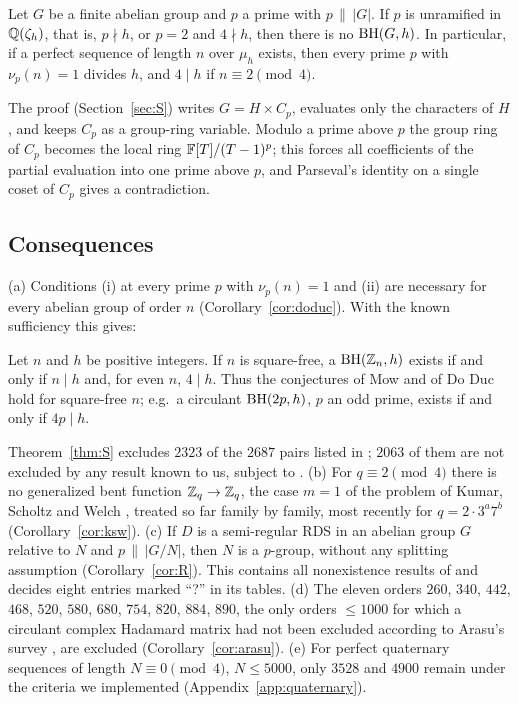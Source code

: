 \begin{theorem}\label{thm:S}
Let $G$ be a finite abelian group and $p$ a prime with $p\,\|\,|G|$. If
$p$ is unramified in $\mathbb{Q}(\zeta_h)$, that is, $p\nmid h$, or $p=2$ and
$4\nmid h$, then there is no $\operatorname{BH}(G,h)$. In particular, if a perfect
sequence of length $n$ over $\mu_h$ exists, then every prime $p$ with
$\nu_p(n)=1$ divides $h$, and $4\mid h$ if $n\equiv2\pmod4$.
\end{theorem}

The proof (Section~\ref{sec:S}) writes $G=H\times C_p$, evaluates only
the characters of $H$, and keeps $C_p$ as a group-ring variable. Modulo a
prime above $p$ the group ring of $C_p$ becomes the local ring
$\mathbb{F}[T]/(T-1)^p$; this forces all coefficients of the partial evaluation
into one prime above $p$, and Parseval's identity on a single coset of
$C_p$ gives a contradiction.

\subsection{Consequences}
(a) Conditions (i) at every prime $p$ with $\nu_p(n)=1$ and (ii) are
necessary for every abelian group of order $n$ (Corollary~\ref{cor:doduc}).
With the known sufficiency this gives:

\begin{corollary}\label{cor:squarefree}
Let $n$ and $h$ be positive integers. If $n$ is square-free, a
$\operatorname{BH}(\mathbb{Z}_n,h)$ exists if and only if $n\mid h$
and, for even $n$, $4\mid h$. Thus the conjectures of Mow and of Do Duc
hold for square-free $n$; e.g.\ a circulant $\operatorname{BH}(2p,h)$, $p$ an odd
prime, exists if and only if $4p\mid h$. 
\end{corollary}

\noindent Theorem~\ref{thm:S} excludes $2323$ of the $2687$ pairs listed
in \cite[Remark~3.13]{DoDuc2019}; $2063$ of them are not excluded by any
result known to us, subject to \cite{LeungChueZhao2025}. (b) For $q\equiv2\pmod4$ there is no generalized bent
function $\mathbb{Z}_q\to\mathbb{Z}_q$, the case $m=1$ of the problem of Kumar, Scholtz
and Welch \cite{KumarScholtzWelch1985}, treated so far family by family,
most recently for $q=2\cdot3^a7^b$ \cite{YingDeng2026}
(Corollary~\ref{cor:ksw}). (c) If $D$ is a semi-regular RDS in an
abelian group $G$ relative to $N$ and $p\,\|\,|G/N|$, then $N$ is a
$p$-group, without any splitting assumption (Corollary~\ref{cor:R}).
This contains all nonexistence results of
\cite[Sect.~6]{LeungSchmidtZhang2023} and decides eight entries marked
``?'' in its tables. (d) The eleven orders $260$, $340$, $442$, $468$,
$520$, $580$, $680$, $754$, $820$, $884$, $890$, the only orders $\le1000$
for which a circulant complex Hadamard matrix had not been excluded
according to Arasu's survey \cite{Arasu2011}, are excluded
(Corollary~\ref{cor:arasu}). (e) For perfect quaternary sequences of
length $N\equiv0\pmod4$, $N\le5000$, only $3528$ and $4900$ remain
under the criteria we implemented (Appendix~\ref{app:quaternary}).

